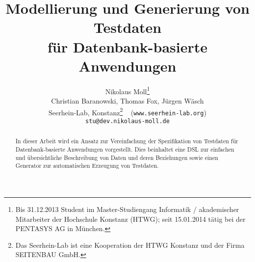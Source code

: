 \documentclass{lni}
\author{
	Nikolaus Moll\footnote{Bis 31.12.2013 Student im Master-Studiengang Informatik / akademischer Mitarbeiter der Hochschule Konstanz (HTWG); seit 15.01.2014 tätig bei der PENTASYS AG in München.}
\\ Christian Baranowski, Thomas Fox, Jürgen Wäsch \\ 
Seerhein-Lab, Konstanz\footnote{Das Seerhein-Lab ist eine Kooperation der HTWG Konstanz und der Firma SEITENBAU GmbH.} \texttt{ } (\texttt{www.seerhein-lab.org})\\ 
           \texttt{stu@dev.nikolaus-moll.de}
}
\title{Modellierung und Generierung von Testdaten\\ für Datenbank-basierte Anwendungen}
\begin{document}
\maketitle




\begin{abstract}
%
In dieser Arbeit wird ein Ansatz zur Vereinfachung der Spezifikation von Testdaten für Datenbank-basierte Anwendungen vorgestellt. 
%
Dies beinhaltet eine DSL zur einfachen und übersichtliche Beschreibung von Daten und deren Beziehungen sowie einen Generator zur automatischen Erzeugung von Testdaten. 
%
%

%

\end{abstract}
















\end{document}
